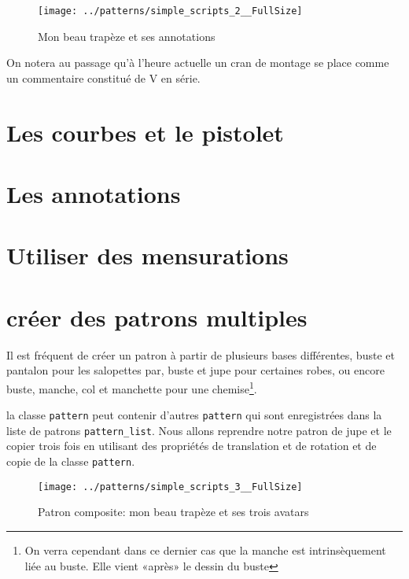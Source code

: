 \documentclass[11pt,a4paper]{report}
\begin{document}
\begin{figure}
\begin{center}
\texttt{[image: ../patterns/simple\_scripts\_2\_\_FullSize]}
\end{center}
\caption{Mon beau trapèze et ses annotations}
\label{fig:trapeze}
\end{figure}

On notera au passage qu'à l'heure actuelle un cran de montage se place comme un commentaire constitué de V en série.

\section{Les courbes et le pistolet}

\section{Les annotations}

\section{Utiliser des mensurations}

\section{créer des patrons multiples}
Il est fréquent de créer un patron à partir de plusieurs bases différentes, buste et pantalon pour les salopettes par, buste et jupe pour certaines robes, ou encore buste, manche, col et manchette pour une chemise\footnote{On verra cependant dans ce dernier cas que la manche est intrinsèquement liée au buste. Elle vient «après» le dessin du buste}.

la classe \texttt{pattern} peut contenir d'autres \texttt{pattern} qui sont enregistrées dans la liste de patrons \texttt{pattern\_list}. Nous allons reprendre notre patron de jupe et le copier trois fois en utilisant des propriétés de translation et de rotation et de copie de la classe \texttt{pattern}.




\begin{figure}
\begin{center}
\texttt{[image: ../patterns/simple\_scripts\_3\_\_FullSize]}
\end{center}
\caption{Patron composite: mon beau trapèze et ses trois avatars}
\label{fig:trapeze}
\end{figure}
\end{document}
